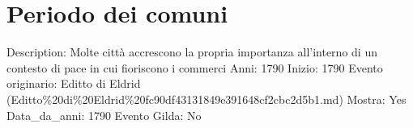 \section{Periodo dei comuni}\label{periodo-dei-comuni}

Description: Molte città accrescono la propria importanza all'interno di
un contesto di pace in cui fioriscono i commerci Anni: 1790 Inizio: 1790
Evento originario: Editto di Eldrid
(Editto\%20di\%20Eldrid\%20fc90df43131849e391648cf2cbc2d5b1.md) Mostra:
Yes Data\_da\_anni: 1790 Evento Gilda: No
